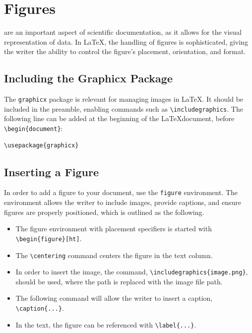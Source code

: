 \documentclass[12pt,journal,compsoc]{IEEEtran}
\begin{document}
\section{Figures}
 are an important aspect of scientific documentation, as it allows for the visual representation of data. In \LaTeX, the handling of figures is sophisticated, giving the writer the ability to control the figure's placement, orientation, and format. 

\subsection{Including the Graphicx Package}
The \texttt{graphicx} package is relevant for managing images in \LaTeX. It should be included in the preamble, enabling commands such as \texttt{\textbackslash includegraphics}. The following line can be added at the beginning of the \LaTeX document, before \texttt{\textbackslash begin\{document\}}:
\begin{verbatim}
\usepackage{graphicx}
\end{verbatim}

\subsection{Inserting a Figure}

In order to add a figure to your document, use the \texttt{figure} environment. The environment allows the writer to include images, provide captions, and ensure figures are properly positioned, which is outlined as the following. 

\begin{itemize}
  \item The figure environment with placement specifiers is started with \texttt{\textbackslash begin\{figure\}[ht]}. 
  \item The \texttt{\textbackslash centering} command centers the figure in the text column.
  \item In order to insert the image, the command, \texttt{\textbackslash includegraphics\{image.png\}}, should be used, where the path is replaced with the image file path. 
  \item The following command will allow the writer to insert a caption, \texttt{\textbackslash caption\{...\}}.
  \item In the text, the figure can be referenced with \texttt{\textbackslash label\{...\}}.
\end{itemize}
\end{document}

